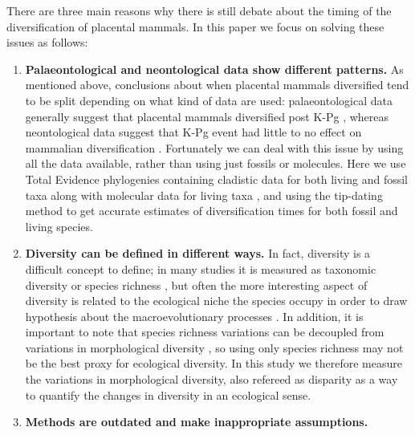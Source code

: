 \documentclass[12pt,letterpaper]{article}
\begin{document}
There are three main reasons why there is still debate about the timing of the diversification of placental mammals. In this paper we focus on solving these issues as follows: %
  \begin{enumerate}
    \item \textbf{Palaeontological and neontological data show different patterns.}
    As mentioned above, conclusions about when placental mammals diversified tend to be split depending on what kind of data are used: palaeontological data generally suggest that placental mammals diversified post K-Pg \citep[e.g.][]{O'Leary08022013}, whereas neontological data suggest that K-Pg event had little to no effect on mammalian diversification \citep{bininda2007delayed,meredithimpacts2011,Stadler12042011}. 
    Fortunately we can deal with this issue by using all the data available, rather than using just fossils or molecules. 
    Here we use Total Evidence phylogenies containing cladistic data for both living and fossil taxa along with molecular data for living taxa \citep{eernissetaxonomic1993,ronquista2012}, and using the tip-dating method \citep{ronquista2012,Wood01032013} to get accurate estimates of diversification times for both fossil and living species.
    \item \textbf{Diversity can be defined in different ways.}
    In fact, diversity is a difficult concept to define; in many studies it is measured as taxonomic diversity or species richness \citep{Stadler12042011,meredithimpacts2011,O'Leary08022013}, but often the more interesting aspect of diversity is related to the ecological niche the species occupy \citep{Wesley-Hunt2005,Brusatte12092008,toljagictriassic-jurassic2013} in order to draw hypothesis about the macroevolutionary processes \citep{Pearman2008149,OlsonRadiation,Losos2010,glor2010phylogenetic}.
    In addition, it is important to note that species richness variations can be decoupled from variations in morphological diversity \citep{slaterCetacean,ruta2013,hopkinsdecoupling2013}, so using only species richness may not be the best proxy for ecological diversity.
    In this study we therefore measure the variations in morphological diversity, also refereed as disparity \citep{Wills1994,BIJ:BIJ455,Wesley-Hunt2005,brusatte50,cisneros2010,prentice2011,anderson2012using,Hughes20082013,bentonmodels2014} as a way to quantify the changes in diversity in an ecological sense.
    \item \textbf{Methods are outdated and make inappropriate assumptions.}

\end{enumerate}
\end{document}
